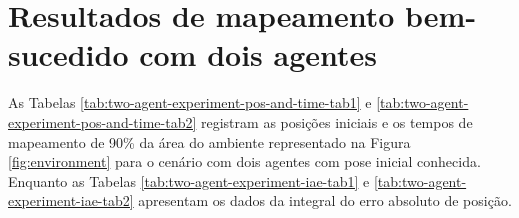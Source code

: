 \begin{table}[]
\end{table}

\clearpage

\section{Resultados de mapeamento bem-sucedido com dois agentes}
\label{app:two-agent-data}

As Tabelas \ref{tab:two-agent-experiment-pos-and-time-tab1} e \ref{tab:two-agent-experiment-pos-and-time-tab2} registram as posições 
iniciais e os tempos de mapeamento de 90\% da área do ambiente 
representado na Figura \ref{fig:environment} para o cenário com dois 
agentes com pose inicial conhecida. Enquanto as Tabelas \ref{tab:two-agent-experiment-iae-tab1} e \ref{tab:two-agent-experiment-iae-tab2} apresentam os dados da integral do erro absoluto de posição.

